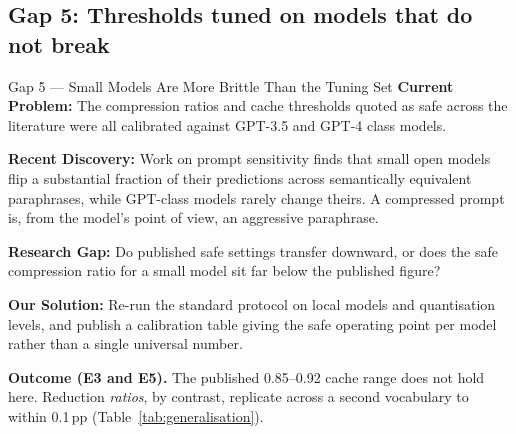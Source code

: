 \documentclass[11pt,a4paper]{article}
\newcommand{\lbl}[1]{\textcolor{accent}{\textbf{#1}}}
\begin{document}
\subsection{Gap 5: Thresholds tuned on models that do not break}
\begin{gap}{Gap 5 --- Small Models Are More Brittle Than the Tuning Set}
\lbl{Current Problem:} The compression ratios and cache thresholds quoted as safe
across the literature were all calibrated against GPT-3.5 and GPT-4 class models.

\lbl{Recent Discovery:} Work on prompt sensitivity finds that small open models
flip a substantial fraction of their predictions across semantically equivalent
paraphrases, while GPT-class models rarely change theirs. A compressed prompt is,
from the model's point of view, an aggressive paraphrase.

\lbl{Research Gap:} Do published safe settings transfer downward, or does the
safe compression ratio for a small model sit far below the published figure?

\lbl{Our Solution:} Re-run the standard protocol on local models and
quantisation levels, and publish a calibration table giving the safe operating
point per model rather than a single universal number.
\end{gap}
\noindent\textbf{Outcome (E3 and E5).} The published 0.85--0.92 cache range does
not hold here. Reduction \emph{ratios}, by contrast, replicate across a second
vocabulary to within 0.1\,pp (Table~\ref{tab:generalisation}).
\end{document}
